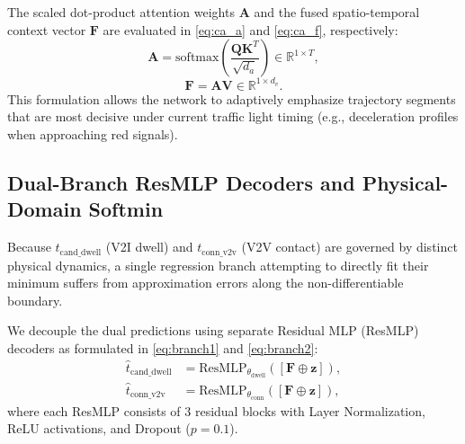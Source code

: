 \documentclass[journal]{IEEEtran}
\begin{document}
The scaled dot-product attention weights $\mathbf{A}$ and the fused spatio-temporal context vector $\mathbf{F}$ are evaluated in \eqref{eq:ca_a} and \eqref{eq:ca_f}, respectively:
\begin{equation}
\mathbf{A} = \text{softmax}\left( \frac{\mathbf{Q} \mathbf{K}^T}{\sqrt{d_a}} \right) \in \mathbb{R}^{1 \times T},
\label{eq:ca_a}
\end{equation}
\begin{equation}
\mathbf{F} = \mathbf{A} \mathbf{V} \in \mathbb{R}^{1 \times d_v}.
\label{eq:ca_f}
\end{equation}
This formulation allows the network to adaptively emphasize trajectory segments that are most decisive under current traffic light timing (e.g., deceleration profiles when approaching red signals).

\subsection{Dual-Branch ResMLP Decoders and Physical-Domain Softmin}\label{sec:decoder}
Because $t_{\text{cand\_dwell}}$ (V2I dwell) and $t_{\text{conn\_v2v}}$ (V2V contact) are governed by distinct physical dynamics, a single regression branch attempting to directly fit their minimum suffers from approximation errors along the non-differentiable boundary.

We decouple the dual predictions using separate Residual MLP (ResMLP) decoders as formulated in \eqref{eq:branch1} and \eqref{eq:branch2}:
\begin{align}
\hat{t}_{\text{cand\_dwell}} &= \text{ResMLP}_{\theta_{\text{dwell}}}([\mathbf{F} \oplus \mathbf{z}]), \label{eq:branch1} \\
\hat{t}_{\text{conn\_v2v}} &= \text{ResMLP}_{\theta_{\text{conn}}}([\mathbf{F} \oplus \mathbf{z}]), \label{eq:branch2}
\end{align}
where each ResMLP consists of 3 residual blocks with Layer Normalization, ReLU activations, and Dropout ($p=0.1$).
\end{document}
